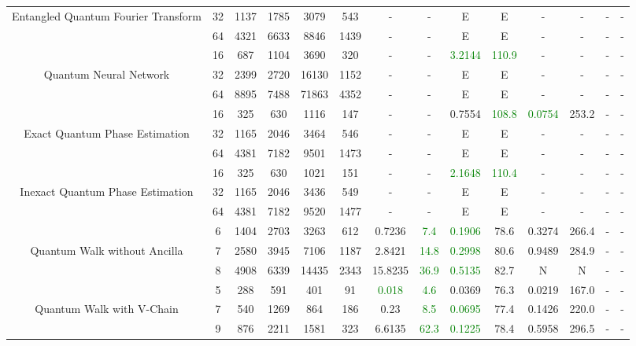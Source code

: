 \begin{table}[htb]
{\begin{tabular}{|c|c|c|c|c|c|c|c|c|c|c|c|c|c|}
Entangled Quantum Fourier Transform & 
32 & 1137 & 1785 & 3079 & 543
 & - & -
 & E & E
 & - & -
 & - & -
 \\
 & 
64 & 4321 & 6633 & 8846 & 1439
 & - & -
 & E & E
 & - & -
 & - & -
 \\
\hline
 & 
16 & 687 & 1104 & 3690 & 320
 & - & -
 & \textcolor{green}{3.2144} & \textcolor{green}{110.9}
 & - & -
 & - & -
 \\
Quantum Neural Network & 
32 & 2399 & 2720 & 16130 & 1152
 & - & -
 & E & E
 & - & -
 & - & -
 \\
 & 
64 & 8895 & 7488 & 71863 & 4352
 & - & -
 & E & E
 & - & -
 & - & -
 \\
\hline
 & 
16 & 325 & 630 & 1116 & 147
 & - & -
 & 0.7554 & \textcolor{green}{108.8}
 & \textcolor{green}{0.0754} & 253.2
 & - & -
 \\
Exact Quantum Phase Estimation & 
32 & 1165 & 2046 & 3464 & 546
 & - & -
 & E & E
 & - & -
 & - & -
 \\
 & 
64 & 4381 & 7182 & 9501 & 1473
 & - & -
 & E & E
 & - & -
 & - & -
 \\
\hline
 & 
16 & 325 & 630 & 1021 & 151
 & - & -
 & \textcolor{green}{2.1648} & \textcolor{green}{110.4}
 & - & -
 & - & -
 \\
Inexact Quantum Phase Estimation & 
32 & 1165 & 2046 & 3436 & 549
 & - & -
 & E & E
 & - & -
 & - & -
 \\
 & 
64 & 4381 & 7182 & 9520 & 1477
 & - & -
 & E & E
 & - & -
 & - & -
 \\
\hline
 & 
6 & 1404 & 2703 & 3263 & 612
 & 0.7236 & \textcolor{green}{7.4}
 & \textcolor{green}{0.1906} & 78.6
 & 0.3274 & 266.4
 & - & -
 \\
Quantum Walk without Ancilla & 
7 & 2580 & 3945 & 7106 & 1187
 & 2.8421 & \textcolor{green}{14.8}
 & \textcolor{green}{0.2998} & 80.6
 & 0.9489 & 284.9
 & - & -
 \\
 & 
8 & 4908 & 6339 & 14435 & 2343
 & 15.8235 & \textcolor{green}{36.9}
 & \textcolor{green}{0.5135} & 82.7
 & N & N 
 & - & -
 \\
\hline
 & 
5 & 288 & 591 & 401 & 91
 & \textcolor{green}{0.018} & \textcolor{green}{4.6}
 & 0.0369 & 76.3
 & 0.0219 & 167.0
 & - & -
 \\
Quantum Walk with V-Chain & 
7 & 540 & 1269 & 864 & 186
 & 0.23 & \textcolor{green}{8.5}
 & \textcolor{green}{0.0695} & 77.4
 & 0.1426 & 220.0
 & - & -
 \\
 & 
9 & 876 & 2211 & 1581 & 323
 & 6.6135 & \textcolor{green}{62.3}
 & \textcolor{green}{0.1225} & 78.4
 & 0.5958 & 296.5
 & - & -

\end{tabular}}
\end{table}
